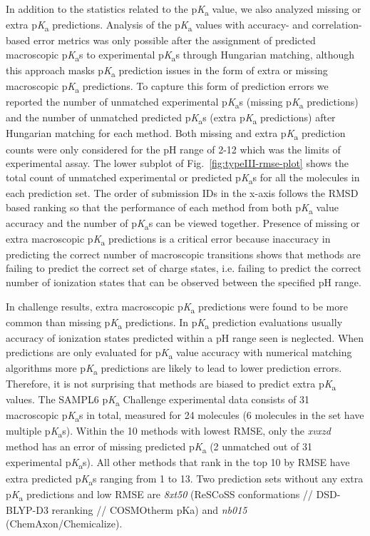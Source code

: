 \documentclass[9pt,lineno,final]{elife}
\newcommand{\pKa}{p\textit{K}\textsubscript{a}}
\begin{document}
In addition to the statistics related to the  \pKa{} value, we also analyzed missing or extra \pKa{} predictions. 
Analysis of the \pKa{} values with accuracy- and correlation-based error metrics was only possible after the assignment of predicted macroscopic \pKa{}s to experimental \pKa{}s through Hungarian matching, although this approach masks \pKa{} prediction issues in the form of extra or missing macroscopic \pKa{} predictions. 
To capture this form of prediction errors we reported the number of unmatched experimental \pKa{}s (missing \pKa{} predictions) and the number of unmatched predicted \pKa{}s (extra \pKa{} predictions) after Hungarian matching for each method. 
Both missing and extra \pKa{} prediction counts were only considered for the pH range of 2-12 which was the limits of experimental assay.
The lower subplot of Fig.~\ref{fig:typeIII-rmse-plot} shows the total count of unmatched experimental or predicted \pKa{}s for all the molecules in each prediction set. The order of submission IDs in the x-axis follows the RMSD based ranking so that the performance of each method from both \pKa{} value accuracy and the number of \pKa{}s can be viewed together.
Presence of missing or extra macroscopic \pKa{} predictions is a critical error because inaccuracy in predicting the correct number of macroscopic transitions shows that methods are failing to predict the correct set of charge states, i.e. failing to predict the correct number of ionization states that can be observed between the specified pH range. 

In challenge results, extra macroscopic \pKa{} predictions were found to be more common than missing \pKa{} predictions. 
In \pKa{} prediction evaluations usually accuracy of ionization states predicted within a pH range seen is neglected. 
When predictions are only evaluated for \pKa{} value accuracy with numerical matching algorithms more \pKa{} predictions are likely to lead to lower prediction errors. 
Therefore, it is not surprising that methods are biased to predict extra \pKa{} values. 
The SAMPL6 \pKa{} Challenge experimental data consists of 31 macroscopic \pKa{}s in total, measured for 24 molecules (6 molecules in the set have multiple \pKa{}s).
Within the 10 methods with lowest RMSE, only the \textit{xvxzd} method has an error of missing predicted \pKa{} (2 unmatched out of 31 experimental \pKa{}s). All other methods that rank in the top 10 by RMSE have extra predicted \pKa{}s ranging from 1 to 13. Two prediction sets without any extra \pKa{} predictions and low RMSE are \textit{8xt50} (ReSCoSS conformations // DSD-BLYP-D3 reranking // COSMOtherm pKa) and \textit{nb015} (ChemAxon/Chemicalize).
\end{document}
